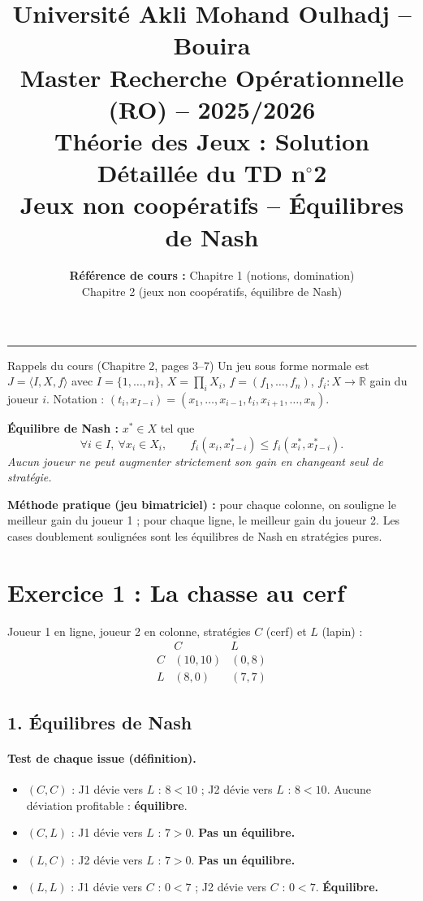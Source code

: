 \documentclass[11pt,a4paper]{article}
\title{\textbf{Université Akli Mohand Oulhadj -- Bouira}\\
\large Master Recherche Opérationnelle (RO) -- 2025/2026\\
\Large \textbf{Théorie des Jeux : Solution Détaillée du TD n$^\circ$2}\\
\large Jeux non coopératifs -- Équilibres de Nash}
\author{\textbf{Référence de cours :} Chapitre 1 (notions, domination)\\ Chapitre 2 (jeux non coopératifs, équilibre de Nash)}
\date{}
\begin{document}
\maketitle
\hrule
\vspace{0.4cm}

\begin{propbox}{Rappels du cours (Chapitre 2, pages 3--7)}
Un jeu sous forme normale est $J=\langle I,X,f\rangle$ avec $I=\{1,\dots,n\}$, $X=\prod_i X_i$, $f=(f_1,\dots,f_n)$, $f_i:X\to\mathbb{R}$ gain du joueur $i$. Notation : $(t_i,x_{I-i})=(x_1,\dots,x_{i-1},t_i,x_{i+1},\dots,x_n)$.

\textbf{Équilibre de Nash :} $x^*\in X$ tel que
\[
\forall i\in I,\ \forall x_i\in X_i,\qquad f_i(x_i,x^*_{I-i})\le f_i(x^*_i,x^*_{I-i}).
\]
\emph{Aucun joueur ne peut augmenter strictement son gain en changeant seul de stratégie.}

\textbf{Méthode pratique (jeu bimatriciel) :} pour chaque colonne, on souligne le meilleur gain du joueur 1 ; pour chaque ligne, le meilleur gain du joueur 2. Les cases doublement soulignées sont les équilibres de Nash en stratégies pures.
\end{propbox}

\section*{Exercice 1 : La chasse au cerf}

Joueur 1 en ligne, joueur 2 en colonne, stratégies $C$ (cerf) et $L$ (lapin) :
\[
\begin{array}{c|cc}
 & C & L\\\hline
C & (10,10) & (0,8)\\
L & (8,0) & (7,7)
\end{array}
\]

\subsection*{1. Équilibres de Nash}
\paragraph{Test de chaque issue (définition).}
\begin{itemize}
\item $(C,C)$ : J1 dévie vers $L$ : $8<10$ ; J2 dévie vers $L$ : $8<10$. Aucune déviation profitable : \textbf{équilibre}.
\item $(C,L)$ : J1 dévie vers $L$ : $7>0$. \textbf{Pas un équilibre.}
\item $(L,C)$ : J2 dévie vers $L$ : $7>0$. \textbf{Pas un équilibre.}
\item $(L,L)$ : J1 dévie vers $C$ : $0<7$ ; J2 dévie vers $C$ : $0<7$. \textbf{Équilibre.}
\end{itemize}
\end{document}
